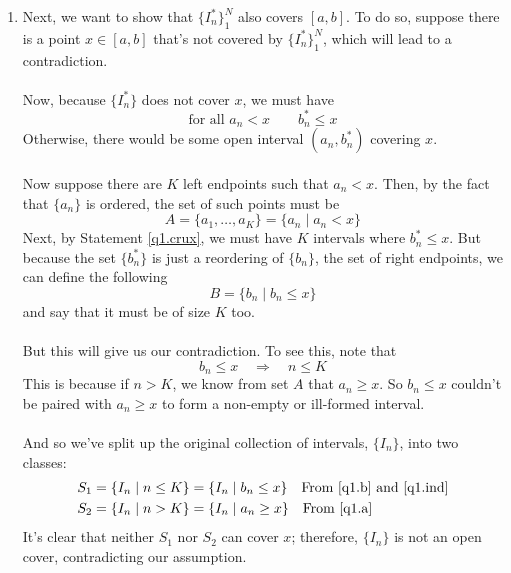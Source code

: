 \documentclass[12pt]{article}
\theoremstyle{plain}
\theoremstyle{definition}
\theoremstyle{remark}
\begin{document}
\begin{enumerate}
\begin{enumerate}
\item Next, we want to show that $\{I_n^*\}^N_1$ also covers $[a,b]$. To do so, suppose there is a point $x\in [a,b]$ that's not covered by $\{I_n^*\}^N_1$, which will lead to a contradiction. 
\\
\\
Now, because $\{I^*_n\}$ does not cover $x$, we must have 
\begin{equation}
    \label{q1.crux}
    \text{for all $a_n < x$} \qquad b_n^*\leq x
\end{equation}
Otherwise, there would be some open interval $(a_n, b_n^*)$ covering $x$.
\\
\\
Now suppose there are $K$ left endpoints such that $a_n < x$. Then, by the fact that $\{a_n\}$ is ordered, the set of such points must be 
\begin{equation}
\label{q1.a}
    A = \{a_1, \ldots, a_K\} = \{ a_n \; | \; a_n < x\}
\end{equation}
Next, by Statement \ref{q1.crux}, we must have $K$ intervals where $b_n^*\leq x$. But because the set $\{b_n^*\}$ is just a reordering of $\{b_n\}$, the set of right endpoints, we can define the following
\begin{equation}
\label{q1.b}
    B = \{b_n \; | \; b_n \leq x\}
\end{equation}
and say that it must be of size $K$ too.
\\
\\
But this will give us our contradiction. To see this, note that 
\begin{equation}
    \label{q1.ind}
    b_n \leq x \quad \Rightarrow \quad n \leq K
\end{equation}
This is because if $n>K$, we know from set $A$ that $a_n\geq x$. So $b_n\leq x$ couldn't be paired with $a_n \geq x$ to form a non-empty or ill-formed interval.
\\
\\
And so we've split up the original collection of intervals, $\{I_n\}$, into two classes:
\begin{align*}
    S_1 &= \{I_n \; | \; n \leq K \} = \{ I_n \; | \; b_n \leq x \} 
        \quad \text{From \ref{q1.b} and \ref{q1.ind}} \\
    S_2 &= \{I_n \; | \; n > K \} = \{ I_n \; | \; a_n \geq x \} 
        \quad \text{From \ref{q1.a}}
\end{align*}
It's clear that neither $S_1$ nor $S_2$ can cover $x$; therefore, $\{I_n\}$ is not an open cover, contradicting our assumption.
\end{enumerate}


\end{enumerate}
\end{document}
